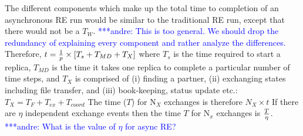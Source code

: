 \documentclass{rspublic}
\newcommand{\jhanote}[1]{ {\textcolor{red} { ***shantenu: #1 }}}
\newcommand{\alnote}[1]{ {\textcolor{blue} { ***andre: #1 }}}
\newcommand{\alnote}[1]{}
\newcommand{\jhanote}[1]{}
\begin{document}

The different components which make up the total time to completion of 
an asynchronous RE run would be similar to the traditional RE run, 
except that there would not be a $T_W$. \alnote{This is too general. 
We should drop the redundancy of explaining every component and rather 
analyze the differences.}
Therefore,  $t=  {1 \over p} \times {[T_s+T_{MD} + T_{X}]} $
where $T_{s}$ is the time required to start a replica, $T_{MD}$ is the time it takes one replica to complete a particular number of time steps,
and $T_{X}$ is comprised of (i) finding a partner, (ii) exchanging
states including file transfer, and (iii) book-keeping, status update
etc.: ${T_{X}} = {T_F + T_{ex} + T_{coord}}$ 
The time ($T$) for N$_{X}$ exchanges is therefore $N_{X} \times t$
If there are $\eta$ independent exchange events then the time $T$ for 
N$_x$ exchanges is $T \over \eta$. \alnote{What is the value of $\eta$ for async RE?}


  
\end{document}

